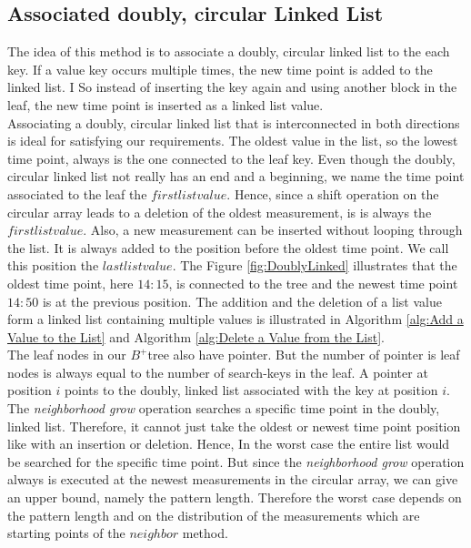 \documentclass[abstracton,12pt]{scrreprt}
\begin{document}
\subsection{Associated doubly, circular Linked List}
\label{doublyLinked}
The idea of this method is to associate a doubly, circular linked list to the each key. If a value key occurs multiple times, the new time point is added to the linked list.  I  So instead of inserting the key again and using another block in the leaf, the new time point is inserted as a linked list value.\\ 
Associating a doubly, circular linked list that is interconnected in both directions is ideal for satisfying our requirements. The oldest value in the list, so the lowest time point, always is the one connected to the leaf key. Even though the doubly, circular linked list not really has an end and a beginning, we name the time point associated to the leaf the $first list value$. Hence, since a shift operation on the circular array leads to a deletion of the oldest measurement, is is always the $first list value$. Also, a new measurement can be inserted without looping through the list. It is always added to the position before the oldest time point. We call this position the $last list value$. The Figure \ref{fig:DoublyLinked} illustrates that the oldest time point, here $14:15$, is connected to the tree and the newest time point $14:50$ is at the previous position. The addition and the deletion of a list value form a linked list containing multiple values is illustrated in Algorithm \ref{alg:Add a Value to the List} and Algorithm \ref{alg:Delete a Value from the List}.\\
The leaf nodes in our $B^+$tree also have pointer. But the number of pointer is leaf nodes is always equal to the number of search-keys in the leaf. A pointer at position $i$ points to the doubly, linked list associated with the key at position $i$.\\
The \emph{neighborhood grow} operation searches a specific time point in the doubly, linked list. Therefore, it cannot just take the oldest or newest time point position like with an insertion or deletion. Hence, In the worst case the entire list would be searched for the specific time point. But since the \emph{neighborhood grow} operation always is executed at the newest measurements in the circular array, we can give an upper bound, namely the pattern length. Therefore the worst case depends on the pattern length and on the distribution of the measurements which are  starting points of the $neighbor$ method.  
\end{document}
